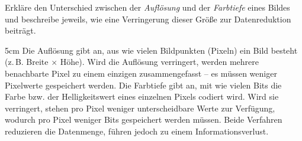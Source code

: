 \question[3]
Erkläre den Unterschied zwischen der \emph{Auflösung} und der \emph{Farbtiefe} 
eines Bildes und beschreibe jeweils, wie eine Verringerung dieser Größe
 zur Datenreduktion beiträgt.

\begin{solutionbox}{5cm}
Die Auflösung gibt an, aus wie vielen Bildpunkten (Pixeln) ein Bild besteht 
(z.\,B. Breite $\times$ Höhe). Wird die Auflösung verringert, werden mehrere benachbarte 
Pixel zu einem einzigen zusammengefasst -- es müssen weniger Pixelwerte gespeichert werden.
Die Farbtiefe gibt an, mit wie vielen Bits die Farbe bzw. 
der Helligkeitswert eines einzelnen Pixels codiert wird. Wird sie verringert, 
stehen pro Pixel weniger unterscheidbare Werte zur Verfügung, wodurch pro Pixel 
weniger Bits gespeichert werden müssen.
Beide Verfahren reduzieren die Datenmenge, führen jedoch zu einem Informationsverlust.
\end{solutionbox}